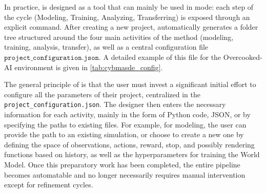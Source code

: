 In practice,  is designed as a tool that can mainly be used in  mode: each step of the  cycle (Modeling, Training, Analyzing, Transferring) is exposed through an explicit command.
%
After creating a new project,  automatically generates a folder tree structured around the four main activities of the  method (modeling, training, analysis, transfer), as well as a central configuration file $\texttt{project\_configuration.json}$. A detailed example of this file for the Overcooked-AI environment is given in \autoref{tab:cybmasde_config}.



The general principle of  is that the user must invest a significant initial effort to configure all the parameters of their project, centralized in the \texttt {project\_configuration.json}.
The designer then enters the necessary information for each activity, mainly in the form of Python code, JSON, or by specifying the paths to existing files. For example, for modeling, the user can provide the path to an existing simulation, or choose to create a new one by defining the space of observations, actions, reward, stop, and possibly rendering functions based on history, as well as the hyperparameters for training the World Model.
Once this preparatory work has been completed, the entire pipeline becomes automatable and no longer necessarily requires manual intervention except for refinement cycles.

\medskip

